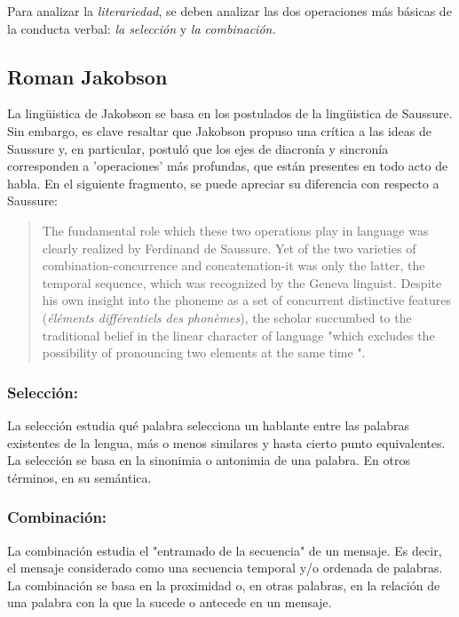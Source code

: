 \documentclass[12pt,letterpaper,twoside]{article}
\begin{document}
Para analizar la \emph{literariedad}, se deben analizar las dos operaciones
más básicas de la conducta verbal: \emph{la selección} y \emph{la combinación.} 




\subsection{Roman Jakobson}
\label{sec:org08ba049}

La lingüistica de Jakobson se basa en los postulados de la lingüistica
de Saussure. Sin embargo, es clave resaltar que Jakobson propuso una crítica
a las ideas de Saussure y, en particular, postuló que los ejes de diacronía
y sincronía corresponden a 'operaciones' más profundas, que están presentes
en todo acto de habla. En el siguiente fragmento, se puede apreciar su
diferencia con respecto a Saussure:

\begin{quote}
The fundamental role which these two operations play in language
was clearly realized by Ferdinand de Saussure. Yet of the two
varieties of combination-concurrence and concatenation-it was only
the latter, the temporal sequence, which was recognized by the
Geneva linguist. Despite his own insight into the phoneme as a set
of concurrent distinctive features (\emph{éléments différentiels
des phonèmes}), the scholar succumbed to the traditional belief
in the linear character of language "which excludes the
possibility of pronouncing two elements at the same time ".
\cite[99]{jakobson1956two}
\end{quote}

\subsubsection{Selección:}
\label{sec:org4f56631}

La selección estudia qué palabra selecciona un hablante entre las
palabras existentes de la lengua, más o menos similares y hasta
cierto punto equivalentes. La selección se basa en la sinonimia o
antonimia de una palabra. En otros términos, en su semántica. \cite{jakobson1956two}


\subsubsection{Combinación:}
\label{sec:orga170a74}

La combinación estudia el "entramado de la secuencia" de un
mensaje. Es decir, el mensaje considerado como una secuencia
temporal y/o ordenada de palabras. La combinación se basa en la
proximidad o, en otras palabras, en la relación de una palabra con
la que la sucede o antecede en un mensaje. \cite{jakobson1956two}
\end{document}

